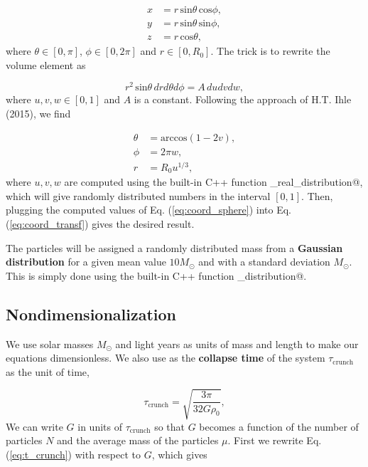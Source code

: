 \documentclass{article}
\begin{document}
\begin{multicols}{2}
\begin{equation}\label{eq:coord_transf}
\begin{aligned}
	x &= r \, \mathrm{sin}\theta \, \mathrm{cos}\phi, \\
	y &= r \, \mathrm{sin}\theta \, \mathrm{sin}\phi, \\
	z &= r \, \mathrm{cos}\theta,
\end{aligned}
\end{equation}
where $\theta \in [0,\pi]$, $\phi \in [0,2\pi]$ and $r \in [0,R_0]$. The trick is to rewrite the volume element as

\begin{equation*}
	r^2 \, \mathrm{sin} \theta \, dr d\theta d\phi = A \, du dv dw,
\end{equation*}
where $u,v,w \in [0,1]$ and $A$ is a constant. Following the approach of H.T. Ihle (2015), we find 

\begin{equation}\label{eq:coord_sphere}
\begin{aligned}
	\theta &= \mathrm{arccos}(1 - 2v), \\
	\phi &= 2\pi w, \\
	r &= R_0 u^{1/3},
\end{aligned}
\end{equation}
where $u,v,w$ are computed using the built-in C++ function \verb@uniform_real_distribution@, which will give randomly distributed numbers in the interval $[0,1]$. Then, plugging the computed values of Eq. (\ref{eq:coord_sphere}) into Eq. (\ref{eq:coord_transf}) gives the desired result. 

The particles will be assigned a randomly distributed mass from a \textbf{Gaussian distribution} for a given mean value $10 M_{\odot}$ and with a standard deviation $M_{\odot}$. This is simply done using the built-in C++ function \verb@normal_distribution@.  



\subsection{Nondimensionalization}\label{sec:nondim}
We use solar masses $M_{\odot}$ and light years as units of mass and length to make our equations dimensionless. We also use as the \textbf{collapse time} of the system $\tau_{\mathrm{crunch}}$ as the unit of time,  %

\begin{equation}\label{eq:t_crunch}
\tau_{\mathrm{crunch}} = \sqrt{\frac{3 \pi}{32G\rho_0}},
\end{equation} 
We can write $G$ in units of $\tau_{\mathrm{crunch}}$ so that $G$ becomes a function of the number of particles $N$ and the average mass of the particles $\mu$. First we rewrite Eq. (\ref{eq:t_crunch}) with respect to $G$, which gives


\end{multicols}
\end{document}
